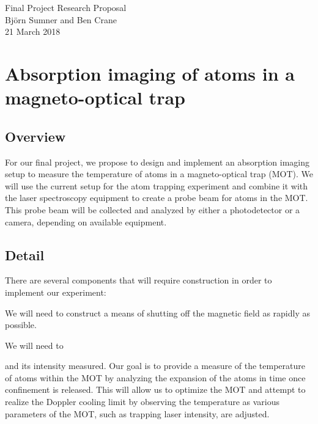 \documentclass[12pt]{article}
\begin{document}
\begin{center}
{\Large Final Project Research Proposal} \\[.3in]
{\large Bj\"{o}rn Sumner and Ben Crane} \\
{21 March 2018}
\end{center}

\section*{Absorption imaging of atoms in a magneto-optical trap}

\subsection*{Overview}
For our final project, we propose to design and implement an absorption imaging setup to measure the temperature of atoms in a magneto-optical trap (MOT).  We will use the current setup for the atom trapping experiment and combine it with the laser spectroscopy equipment to create a probe beam for atoms in the MOT.  This probe beam will be collected and analyzed by either a photodetector or a camera, depending on available equipment.

\subsection*{Detail}

There are several components that will require construction in order to implement our experiment:

We will need to construct a means of shutting off the magnetic field as rapidly as possible.

We will need to 





 and its intensity measured.  Our goal is to provide a measure of the temperature of atoms within the MOT by analyzing the expansion of the atoms in time once confinement is released.  This will allow us to optimize the MOT and attempt to realize the Doppler cooling limit by observing the temperature as various parameters of the MOT, such as trapping laser intensity, are adjusted.
\end{document}

